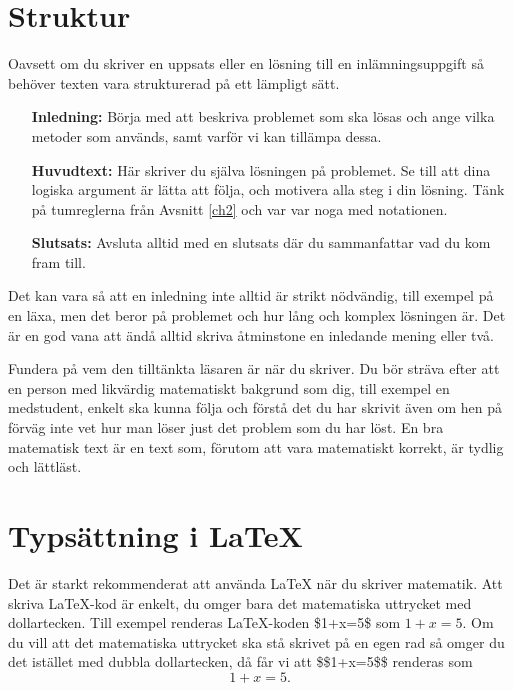 \documentclass[titlepage]{article}
\begin{document}

\section{Struktur}

Oavsett om du skriver en uppsats eller en lösning till en inlämningsuppgift så behöver texten vara strukturerad på ett lämpligt sätt.

\begin{itemize}[leftmargin=25mm, rightmargin=0mm]
    \item[\textbf{Inledning:}] Börja med att beskriva problemet som ska lösas och ange vilka metoder som används, samt varför vi kan tillämpa dessa.
    \item[\textbf{Huvudtext:}] Här skriver du själva lösningen på problemet. Se till att dina logiska argument är lätta att följa, och motivera alla steg i din lösning. Tänk på tumreglerna från Avsnitt \ref{ch2} och var var noga med notationen.
    \item[\textbf{Slutsats:}] Avsluta alltid med en slutsats där du sammanfattar vad du kom fram till.
\end{itemize}

Det kan vara så att en inledning inte alltid är strikt nödvändig, till exempel på en läxa, men det beror på problemet och hur lång och komplex lösningen är. Det är en god vana att ändå alltid skriva åtminstone en inledande mening eller två.

Fundera på vem den tilltänkta läsaren är när du skriver. Du bör sträva efter att en person med likvärdig matematiskt bakgrund som dig, till exempel en medstudent, enkelt ska kunna följa och förstå det du har skrivit även om hen på förväg inte vet hur man löser just det problem som du har löst. En bra matematisk text är en text som, förutom att vara matematiskt korrekt, är tydlig och lättläst.




\section{Typsättning i \LaTeX}

Det är starkt rekommenderat att använda \LaTeX $ $ när du skriver matematik. Att skriva \LaTeX-kod är enkelt, du omger bara det matematiska uttrycket med dollartecken. Till exempel renderas \LaTeX-koden \$1+x=5\$ som $1+x=5$. Om du vill att det matematiska uttrycket ska stå skrivet på en egen rad så omger du det istället med dubbla dollartecken, då får vi att \$\$1+x=5\$\$ renderas som $$1+x=5.$$
\end{document}
